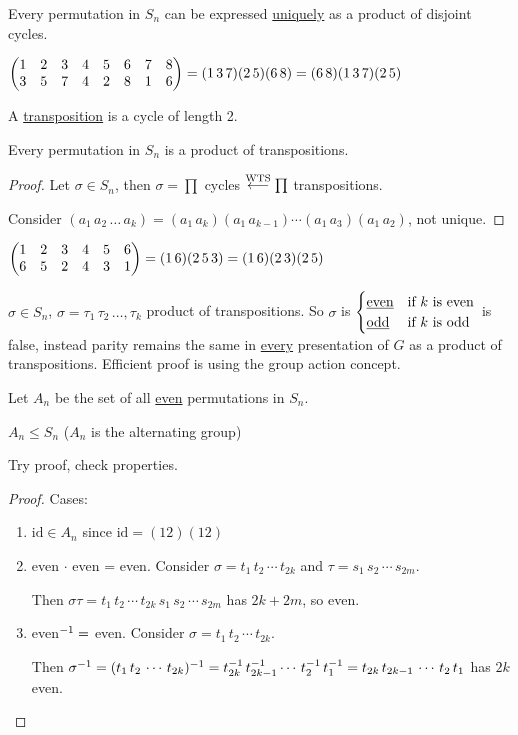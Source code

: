 \documentclass[]{article}
\begin{document}
\begin{theorem}
	Every permutation in $S_n$ can be expressed \ul{uniquely} as a product of disjoint cycles.
\end{theorem}
\begin{example}
	$\begin{pmatrix}1&2&3&4&5&6&7&8\\3&5&7&4&2&8&1&6\end{pmatrix} = (1\,3\,7)(2\,5)(6\,8) = (6\,8)(1\,3\,7)(2\,5)$
\end{example}
\begin{definition}
	A \ul{transposition} is a cycle of length 2.
\end{definition}
\begin{proposition}
	Every permutation in $S_n$ is a product of transpositions.
\end{proposition}
\begin{proof}
	Let $\sigma\in S_n$, then $\sigma = \prod$ cycles $\overset{\text{WTS}}{\longleftarrow} \prod$ transpositions.
	
	Consider $(a_1\,a_2\,\dots\,a_k) = (a_1\,a_k)(a_1\,a_{k-1})\cdots(a_1\,a_3)(a_1\,a_2)$, not unique.
\end{proof}
\begin{example}
	$\begin{pmatrix}1&2&3&4&5&6\\6&5&2&4&3&1\end{pmatrix} = (1\,6)(2\,5\,3) = (1\,6)(2\,3)(2\,5)$
\end{example}

$\sigma\in S_n$, $\sigma = \tau_1\,\tau_2\,\dots,\tau_k$ product of transpositions.
So $\sigma$ is $\begin{cases} \text{\underline{even}} & \text{if $k$ is even} \\ \text{\underline{odd}} & \text{if $k$ is odd} \end{cases}$ is false, instead parity remains the same in \ul{every} presentation of $G$ as a product of transpositions. Efficient proof is using the group action concept.

Let $A_n$ be the set of all \ul{even} permutations in $S_n$.
\begin{proposition}
	$A_n\leq S_n$ ($A_n$ is the alternating group)
\end{proposition}
Try proof, check properties.

\begin{proof}
	Cases:
	\begin{enumerate}
		\item $\text{id}\in A_n$ since $\text{id} = (12)(12)$
		\item even $\cdot$ even = even. Consider $\sigma = t_1\,t_2\,\cdots\,t_{2k}$ and $\tau = s_1\,s_2\,\cdots\,s_{2m}$.
			
			Then $\sigma\tau = t_1\,t_2\,\cdots\,t_{2k}\,s_1\,s_2\,\cdots\,s_{2m}$ has $2k+2m$, so even.
		\item even$^{-1} =$ even. Consider $\sigma = t_1\,t_2\,\cdots\,t_{2k}$.
			
			Then $\sigma^{-1} = (t_1\,t_2\,\cdots\,t_{2k})^{-1} = t_{2k}^{-1}\,t_{2k-1}^{-1}\cdots\, t_2^{-1}\,t_1^{-1} = t_{2k}\,t_{2k-1}\,\cdots\,t_2\,t_1$ has $2k$ even.
	\end{enumerate}
\end{proof}
\end{document}
